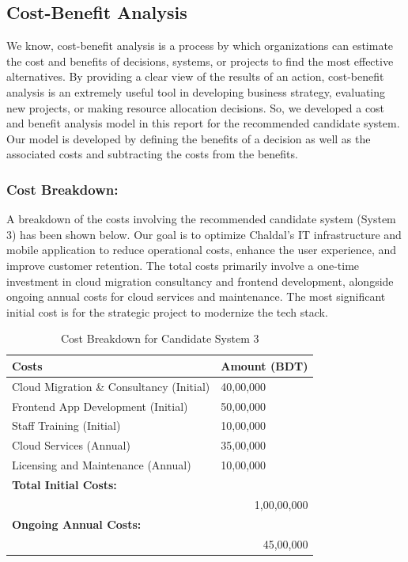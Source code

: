 \documentclass[12pt,a4paper]{article}
\begin{document}
\subsection{Cost-Benefit Analysis}
We know, cost-benefit analysis is a process by which organizations can estimate the cost and benefits of decisions, systems, or projects to find the most effective alternatives. By providing a clear view of the results of an action, cost-benefit analysis is an extremely useful tool in developing business strategy, evaluating new projects, or making resource allocation decisions. So, we developed a cost and benefit analysis model in this report for the recommended candidate system. Our model is developed by defining the benefits of a decision as well as the associated costs and subtracting the costs from the benefits.

\subsubsection{Cost Breakdown:}
A breakdown of the costs involving the recommended candidate system (System 3) has been shown below. Our goal is to optimize Chaldal's IT infrastructure and mobile application to reduce operational costs, enhance the user experience, and improve customer retention. The total costs primarily involve a one-time investment in cloud migration consultancy and frontend development, alongside ongoing annual costs for cloud services and maintenance. The most significant initial cost is for the strategic project to modernize the tech stack.


\begin{table}[h]
\centering
\caption{Cost Breakdown for Candidate System 3}
\begin{tabular}{|p{9cm}|p{3cm}|}
\hline
\textbf{Costs} & \textbf{Amount (BDT)} \\ \hline

Cloud Migration \& Consultancy (Initial) & 40,00,000 \\ \hline

Frontend App Development (Initial) & 50,00,000 \\ \hline

Staff Training (Initial) & 10,00,000 \\ \hline

Cloud Services (Annual) & 35,00,000 \\ \hline

Licensing and Maintenance (Annual) & 10,00,000 \\ \hline

\multicolumn{2}{|l|}{\textbf{Total Initial Costs:}} \\ \hline
\multicolumn{2}{|r|}{1,00,00,000} \\ \hline

\multicolumn{2}{|l|}{\textbf{Ongoing Annual Costs:}} \\ \hline
\multicolumn{2}{|r|}{45,00,000} \\ \hline
\end{tabular}
\end{table}
\end{document}
